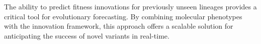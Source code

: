 %
%
%

The ability to predict fitness innovations for previously unseen lineages provides a critical tool for evolutionary forecasting.
By combining molecular phenotypes with the innovation framework, this approach offers a scalable solution for anticipating the success of novel variants in real-time.


